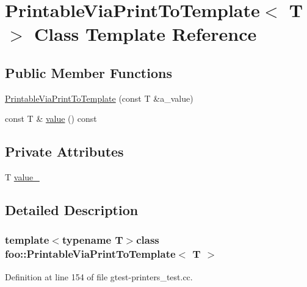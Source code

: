 \hypertarget{classfoo_1_1PrintableViaPrintToTemplate}{\section{\-Printable\-Via\-Print\-To\-Template$<$ \-T $>$ \-Class \-Template \-Reference}
\label{d4/d1d/classfoo_1_1PrintableViaPrintToTemplate}
}
\subsection*{\-Public \-Member \-Functions}
\begin{DoxyCompactItemize}
\item 
\hyperlink{classfoo_1_1PrintableViaPrintToTemplate_a7a4f87fa727851dfbf9270faa3de4aa3}{\-Printable\-Via\-Print\-To\-Template} (const \-T \&a\-\_\-value)
\item 
const \-T \& \hyperlink{classfoo_1_1PrintableViaPrintToTemplate_a56e1c8bae880a4eedf8d23194eca95ca}{value} () const 
\end{DoxyCompactItemize}
\subsection*{\-Private \-Attributes}
\begin{DoxyCompactItemize}
\item 
\-T \hyperlink{classfoo_1_1PrintableViaPrintToTemplate_ae496c0f6edafccdab7ef2e2b9d0c7e03}{value\-\_\-}
\end{DoxyCompactItemize}


\subsection{\-Detailed \-Description}
\subsubsection*{template$<$typename \-T$>$class foo\-::\-Printable\-Via\-Print\-To\-Template$<$ T $>$}



\-Definition at line 154 of file gtest-\/printers\-\_\-test.\-cc.



